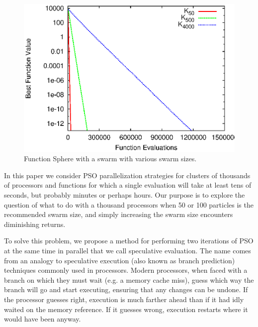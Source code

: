 \documentclass[journal,letterpaper]{IEEEtran}
\begin{document}
\begin{figure}
  \centering
  \includegraphics[width=.8\columnwidth]{evals_sphere}
  \caption{Function Sphere with a swarm with various swarm sizes.}
  \label{fig:evals-sphere}
\end{figure}

In this paper we consider PSO parallelization strategies for clusters of
thousands of processors and functions for which a single evaluation will take
at least tens of seconds, but probably minutes or perhaps hours.  Our purpose
is to explore the question of what to do with a thousand processors when 50 or
100 particles is the recommended swarm size, and simply increasing the swarm
size encounters diminishing returns.

To solve this problem, we propose a method for performing two iterations of PSO
at the same time in parallel that we call speculative evaluation.  The name
comes from an analogy to speculative execution (also known as branch
prediction) techniques commonly used in processors.  Modern processors, when
faced with a branch on which they must wait (e.g. a memory cache miss), guess
which way the branch will go and start executing, ensuring that any changes
can be undone.  If the processor guesses right, execution is
much farther ahead than if it had idly waited on the memory reference.  If
it guesses wrong, execution restarts where it would have been anyway.  
\end{document}
